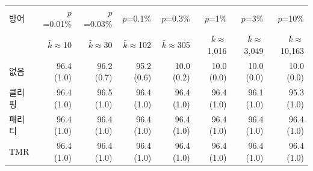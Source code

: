 \setlength{\tabcolsep}{3pt}
\begin{tabular}{lrrrrrrr}
\toprule
방어 & $p$=0.01\% & $p$=0.03\% & $p$=0.1\% & $p$=0.3\% & $p$=1\% & $p$=3\% & $p$=10\% \\
 & $\bar{k}\approx$10 & $\bar{k}\approx$30 & $\bar{k}\approx$102 & $\bar{k}\approx$305 & $\bar{k}\approx$1,016 & $\bar{k}\approx$3,049 & $\bar{k}\approx$10,163 \\
\midrule
없음 & 96.4 (1.0) & 96.2 (0.7) & 95.2 (0.6) & 10.0 (0.2) & 10.0 (0.0) & 10.0 (0.0) & 10.0 (0.0) \\
클리핑 & 96.4 (1.0) & 96.5 (1.0) & 96.4 (1.0) & 96.4 (1.0) & 96.4 (1.0) & 96.1 (1.0) & 95.3 (1.0) \\
패리티 & 96.4 (1.0) & 96.4 (1.0) & 96.4 (1.0) & 96.4 (1.0) & 96.4 (1.0) & 96.4 (1.0) & 96.4 (1.0) \\
TMR & 96.4 (1.0) & 96.4 (1.0) & 96.4 (1.0) & 96.4 (1.0) & 96.4 (1.0) & 96.4 (1.0) & 96.4 (1.0) \\
\bottomrule
\end{tabular}
